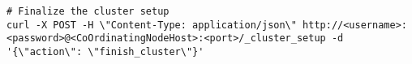\begin{verbatim}
# Finalize the cluster setup
curl -X POST -H \"Content-Type: application/json\" http://<username>:<password>@<CoOrdinatingNodeHost>:<port>/_cluster_setup -d '{\"action\": \"finish_cluster\"}'
\end{verbatim}